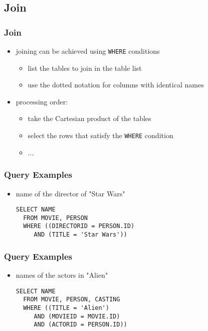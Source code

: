 \documentclass[dvipsnames]{beamer}
\theoremstyle{plain}
\begin{document}
\subsection{Join}

\begin{frame}
  \frametitle{Join}

  \begin{itemize}
    \item joining can be achieved using \lstinline!WHERE! conditions
    \begin{itemize}
      \item list the tables to join in the table list
      \item use the dotted notation for columns with identical names
    \end{itemize}

    \pause
    \medskip
    \item processing order:
    \begin{itemize}
      \item take the Cartesian product of the tables
      \item select the rows that satisfy the \lstinline!WHERE! condition
      \item ...
    \end{itemize}
  \end{itemize}
\end{frame}

\begin{frame}[fragile]
  \frametitle{Query Examples}

  \begin{itemize}
    \item name of the director of "Star Wars"
    \begin{lstlisting}
SELECT NAME
  FROM MOVIE, PERSON
  WHERE ((DIRECTORID = PERSON.ID)
     AND (TITLE = 'Star Wars'))
    \end{lstlisting}
  \end{itemize}
\end{frame}

\begin{frame}[fragile]
  \frametitle{Query Examples}

  \begin{itemize}
    \item names of the actors in "Alien"
     \begin{lstlisting}
SELECT NAME
  FROM MOVIE, PERSON, CASTING
  WHERE ((TITLE = 'Alien')
     AND (MOVIEID = MOVIE.ID)
     AND (ACTORID = PERSON.ID))
      \end{lstlisting}
    \end{itemize}
\end{frame}
\end{document}
